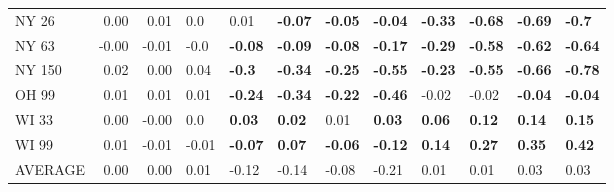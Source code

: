\begin{tabular}{lrrlllllllll}
NY 26   &     0.00 &     0.01 &            0.0 &            0.01 &          \textbf{-0.07} &  \textbf{-0.05} &  \textbf{-0.04} &  \textbf{-0.33} &  \textbf{-0.68} &  \textbf{-0.69} &   \textbf{-0.7} \\
NY 63   &    -0.00 &    -0.01 &           -0.0 &  \textbf{-0.08} &          \textbf{-0.09} &  \textbf{-0.08} &  \textbf{-0.17} &  \textbf{-0.29} &  \textbf{-0.58} &  \textbf{-0.62} &  \textbf{-0.64} \\
NY 150  &     0.02 &     0.00 &           0.04 &   \textbf{-0.3} &          \textbf{-0.34} &  \textbf{-0.25} &  \textbf{-0.55} &  \textbf{-0.23} &  \textbf{-0.55} &  \textbf{-0.66} &  \textbf{-0.78} \\
OH 99   &     0.01 &     0.01 &           0.01 &  \textbf{-0.24} &          \textbf{-0.34} &  \textbf{-0.22} &  \textbf{-0.46} &           -0.02 &           -0.02 &  \textbf{-0.04} &  \textbf{-0.04} \\
WI 33   &     0.00 &    -0.00 &            0.0 &   \textbf{0.03} &           \textbf{0.02} &            0.01 &   \textbf{0.03} &   \textbf{0.06} &   \textbf{0.12} &   \textbf{0.14} &   \textbf{0.15} \\
WI 99   &     0.01 &    -0.01 &          -0.01 &  \textbf{-0.07} &           \textbf{0.07} &  \textbf{-0.06} &  \textbf{-0.12} &   \textbf{0.14} &   \textbf{0.27} &   \textbf{0.35} &   \textbf{0.42} \\
AVERAGE &     0.00 &     0.00 &           0.01 &           -0.12 &                   -0.14 &           -0.08 &           -0.21 &            0.01 &            0.01 &            0.03 &            0.03 \\
\bottomrule
\end{tabular}
